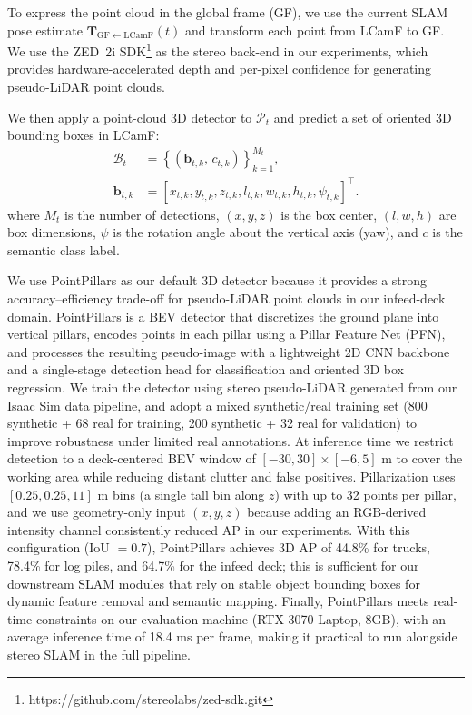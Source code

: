 \documentclass[letterpaper, 10 pt, conference]{IEEEtran}  %
\begin{document}
To express the point cloud in the global frame (GF), we use the current SLAM pose estimate $\mathbf{T}_{\mathrm{GF}\leftarrow\mathrm{LCamF}}(t)$ and transform each point from LCamF to GF.
We use the ZED~2i SDK\footnote{https://github.com/stereolabs/zed-sdk.git} as the stereo back-end in our experiments, which provides hardware-accelerated depth and per-pixel confidence for generating pseudo-LiDAR point clouds.

We then apply a point-cloud 3D detector to $\mathcal{P}_t$ and predict a set of oriented 3D bounding boxes in LCamF:
\begin{equation}
\begin{aligned}
\mathcal{B}_t &= \left\{(\mathbf{b}_{t,k},\, c_{t,k})\right\}_{k=1}^{M_t},\\
\mathbf{b}_{t,k} &= \left[x_{t,k},y_{t,k},z_{t,k},l_{t,k},w_{t,k},h_{t,k},\psi_{t,k}\right]^\top .
\end{aligned}
\label{eq:box_state}
\end{equation}
where $M_t$ is the number of detections, $(x,y,z)$ is the box center, $(l,w,h)$ are box dimensions, $\psi$ is the rotation angle about the vertical axis (yaw), and $c$ is the semantic class label.

We use PointPillars as our default 3D detector because it provides a strong accuracy–efficiency trade-off for pseudo-LiDAR point clouds in our infeed-deck domain. PointPillars is a BEV detector that discretizes the ground plane into vertical pillars, encodes points in each pillar using a Pillar Feature Net (PFN), and processes the resulting pseudo-image with a lightweight 2D CNN backbone and a single-stage detection head for classification and oriented 3D box regression. We train the detector using stereo pseudo-LiDAR generated from our Isaac Sim data pipeline, and adopt a mixed synthetic/real training set (800 synthetic + 68 real for training, 200 synthetic + 32 real for validation) to improve robustness under limited real annotations. At inference time we restrict detection to a deck-centered BEV window of $[-30,30]\times[-6,5]$ m to cover the working area while reducing distant clutter and false positives. Pillarization uses $[0.25,0.25,11]$ m bins (a single tall bin along $z$) with up to 32 points per pillar, and we use geometry-only input $(x,y,z)$ because adding an RGB-derived intensity channel consistently reduced AP in our experiments. With this configuration (IoU $=0.7$), PointPillars achieves 3D AP of 44.8\% for trucks, 78.4\% for log piles, and 64.7\% for the infeed deck; this is sufficient for our downstream SLAM modules that rely on stable object bounding boxes for dynamic feature removal and semantic mapping. Finally, PointPillars meets real-time constraints on our evaluation machine (RTX 3070 Laptop, 8GB), with an average inference time of 18.4 ms per frame, making it practical to run alongside stereo SLAM in the full pipeline.
\end{document}
